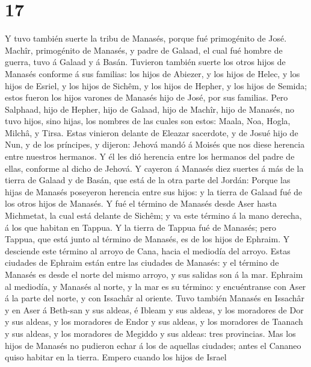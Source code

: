 \hypertarget{section-16}{%
\section{17}\label{section-16}}

 Y tuvo también suerte la tribu de Manasés, porque fué
primogénito de José. Machîr, primogénito de Manasés, y padre de Galaad,
el cual fué hombre de guerra, tuvo á Galaad y á Basán. 
Tuvieron también suerte los otros hijos de Manasés conforme á sus
familias: los hijos de Abiezer, y los hijos de Helec, y los hijos de
Esriel, y los hijos de Sichêm, y los hijos de Hepher, y los hijos de
Semida; estos fueron los hijos varones de Manasés hijo de José, por sus
familias.  Pero Salphaad, hijo de Hepher, hijo de Galaad,
hijo de Machîr, hijo de Manasés, no tuvo hijos, sino hijas, los nombres
de las cuales son estos: Maala, Noa, Hogla, Milchâ, y Tirsa.
 Estas vinieron delante de Eleazar sacerdote, y de Josué
hijo de Nun, y de los príncipes, y dijeron: Jehová mandó á Moisés que
nos diese herencia entre nuestros hermanos. Y él les dió herencia entre
los hermanos del padre de ellas, conforme al dicho de Jehová.
 Y cayeron á Manasés diez suertes á más de la tierra de
Galaad y de Basán, que está de la otra parte del Jordán: 
Porque las hijas de Manasés poseyeron herencia entre sus hijos: y la
tierra de Galaad fué de los otros hijos de Manasés.  Y fué
el término de Manasés desde Aser hasta Michmetat, la cual está delante
de Sichêm; y va este término á la mano derecha, á los que habitan en
Tappua.  Y la tierra de Tappua fué de Manasés; pero Tappua,
que está junto al término de Manasés, es de los hijos de Ephraim.
 Y desciende este término al arroyo de Cana, hacia el
mediodía del arroyo. Estas ciudades de Ephraim están entre las ciudades
de Manasés: y el término de Manasés es desde el norte del mismo arroyo,
y sus salidas son á la mar.  Ephraim al mediodía, y Manasés
al norte, y la mar es su término: y encuéntranse con Aser á la parte del
norte, y con Issachâr al oriente.  Tuvo también Manasés en
Issachâr y en Aser á Beth-san y sus aldeas, é Ibleam y sus aldeas, y los
moradores de Dor y sus aldeas, y los moradores de Endor y sus aldeas, y
los moradores de Taanach y sus aldeas, y los moradores de Megiddo y sus
aldeas: tres provincias.  Mas los hijos de Manasés no
pudieron echar á los de aquellas ciudades; antes el Cananeo quiso
habitar en la tierra.  Empero cuando los hijos de Israel
